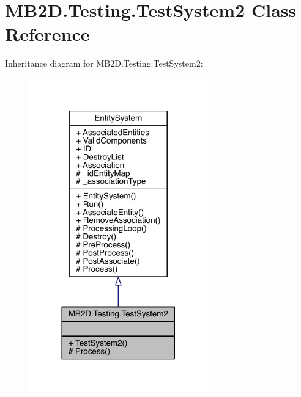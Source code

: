 \hypertarget{class_m_b2_d_1_1_testing_1_1_test_system2}{}\section{M\+B2\+D.\+Testing.\+Test\+System2 Class Reference}
\label{class_m_b2_d_1_1_testing_1_1_test_system2}


Inheritance diagram for M\+B2\+D.\+Testing.\+Test\+System2\+:\nopagebreak
\begin{figure}[H]
\begin{center}
\leavevmode
\includegraphics[width=218pt]{class_m_b2_d_1_1_testing_1_1_test_system2__inherit__graph}
\end{center}
\end{figure}



